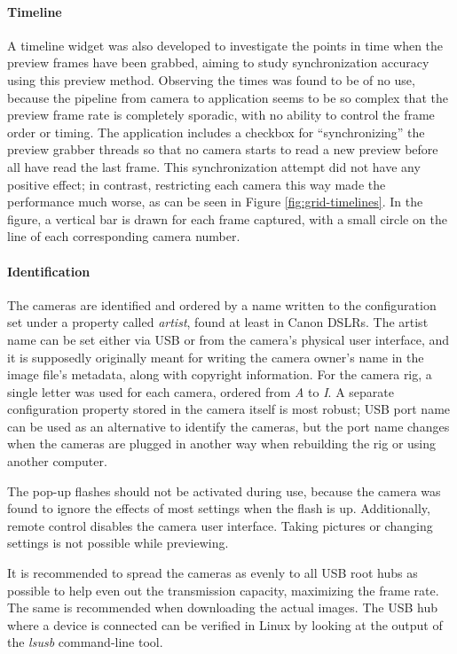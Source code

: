 \paragraph{Timeline}
A timeline widget was also developed to investigate the points in time when the preview frames have been grabbed, aiming to study synchronization accuracy using this preview method.
Observing the times was found to be of no use, because the pipeline from camera to application seems to be so complex that the preview frame rate is completely sporadic, with no ability to control the frame order or timing.
The application includes a checkbox for ``synchronizing'' the preview grabber threads so that no camera starts to read a new preview before all have read the last frame.
This synchronization attempt did not have any positive effect; in contrast, restricting each camera this way made the performance much worse, as can be seen in Figure \ref{fig:grid-timelines}.
In the figure, a vertical bar is drawn for each frame captured, with a small circle on the line of each corresponding camera number.

\paragraph{Identification}
The cameras are identified and ordered by a name written to the configuration set under a property called \emph{artist}, found at least in Canon DSLRs.
The artist name can be set either via USB or from the camera's physical user interface, and it is supposedly originally meant for writing the camera owner's name in the image file's metadata, along with copyright information.
For the camera rig, a single letter was used for each camera, ordered from \emph{A} to \emph{I}.
A separate configuration property stored in the camera itself is most robust; USB port name can be used as an alternative to identify the cameras, but the port name changes when the cameras are plugged in another way when rebuilding the rig or using another computer.

The pop-up flashes should not be activated during use, because the camera was found to ignore the effects of most settings when the flash is up.
Additionally, remote control disables the camera user interface.
Taking pictures or changing settings is not possible while previewing.

It is recommended to spread the cameras as evenly to all USB root hubs as possible to help even out the transmission capacity, maximizing the frame rate.
The same is recommended when downloading the actual images.
The USB hub where a device is connected can be verified in Linux by looking at the output of the \emph{lsusb} command-line tool.

